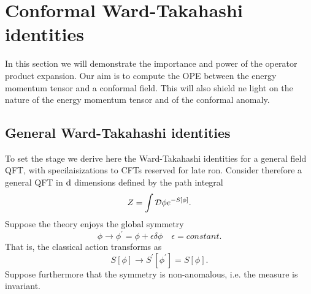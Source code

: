  \section{Conformal Ward-Takahashi identities}
 In this section we will demonstrate the importance and power of the operator product expansion. Our aim is to compute the OPE between the energy momentum tensor and a conformal field. This will also shield ne light on the nature of the energy momentum tensor and of the conformal anomaly.
 \subsection{General Ward-Takahashi identities}
 To set the stage we derive here the Ward-Takahashi identities for a general field QFT, with specilaisizations to CFTs reserved for late ron. Consider therefore a general QFT in $\mathrm{d}$ dimensions defined by the path integral
 \begin{equation}
 Z=\int \mathcal{D} \phi e^{-S[\phi]}.
 \end{equation}
 Suppose the theory enjoys the global symmetry
 \begin{equation}
 \label{eq:globalsymmetry}
 \phi \rightarrow \phi^\prime = \phi + \epsilon \delta \phi \quad \epsilon=constant.
 \end{equation}
 That is, the classical action transforms as
 \begin{equation}
 S[\phi] \longrightarrow S^\prime [\phi^\prime] = S[\phi].
 \end{equation}
 Suppose furthermore that the symmetry is non-anomalous, i.e. the measure is invariant.
 
